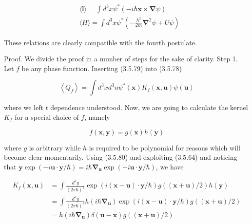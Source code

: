 \documentclass{article}
\begin{document}
 
\begin{align*}
& \langle\boldsymbol{l}\rangle=\int d^{3} x \psi^{*}(-i \hbar \boldsymbol{x} \times \boldsymbol{\nabla} \psi)  \tag{3.5.84}\\
& \langle H\rangle=\int d^{3} x \psi^{*}\left(-\frac{\hbar^{2}}{2 m} \boldsymbol{\nabla}^{2} \psi+U \psi\right) \tag{3.5.85}
\end{align*}
 

These relations are clearly compatible with the fourth postulate.

Proof. We divide the proof in a number of steps for the sake of clarity.
Step 1. Let $f$ be any phase function. Inserting (3.5.79) into (3.5.78)
 
\begin{equation*}
\left\langle Q_{f}\right\rangle=\int d^{3} x d^{3} u \psi^{*}(\boldsymbol{x}) K_{f}(\boldsymbol{x}, \boldsymbol{u}) \psi(\boldsymbol{u}) \tag{3.5.86}
\end{equation*}
 
where we left $t$ dependence understood. Now, we are going to calculate the kernel $K_{f}$ for a special choice of $f$, namely
 
\begin{equation*}
f(\boldsymbol{x}, \boldsymbol{y})=g(\boldsymbol{x}) h(\boldsymbol{y}) \tag{3.5.87}
\end{equation*}
 
where $g$ is arbitrary while $h$ is required to be polynomial for reasons which will become clear momentarily. Using (3.5.80) and exploiting (3.5.64) and noticing that $\boldsymbol{y} \exp (-i \boldsymbol{u} \cdot \boldsymbol{y} / \hbar)=i \hbar \boldsymbol{\nabla}_{\boldsymbol{u}} \exp (-i \boldsymbol{u} \cdot \boldsymbol{y} / \hbar)$, we have
 
\begin{align*}
K_{f}(\boldsymbol{x}, \boldsymbol{u}) & =\int \frac{d^{3} y}{(2 \pi \hbar)^{3}} \exp (i(\boldsymbol{x}-\boldsymbol{u}) \cdot \boldsymbol{y} / \hbar) g((\boldsymbol{x}+\boldsymbol{u}) / 2) h(\boldsymbol{y})  \tag{3.5.88}\\
& =\int \frac{d^{3} y}{(2 \pi \hbar)^{3}} h\left(i \hbar \boldsymbol{\nabla}_{\boldsymbol{u}}\right) \exp (i(\boldsymbol{x}-\boldsymbol{u}) \cdot \boldsymbol{y} / \hbar) g((\boldsymbol{x}+\boldsymbol{u}) / 2) \\
& =h\left(i \hbar \boldsymbol{\nabla}_{\boldsymbol{u}}\right) \delta(\boldsymbol{u}-\boldsymbol{x}) g((\boldsymbol{x}+\boldsymbol{u}) / 2)
\end{align*}
 
\end{document}
